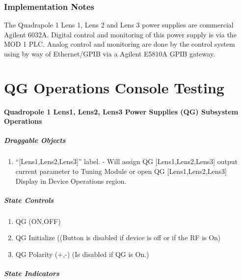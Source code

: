 \documentclass[11pt]{book}		%
\begin{document}
\subsection{Implementation Notes} \label{sect:cyc-equip-ctl-beamline-sm23a-implementation}

The Quadrapole 1 Lens 1, Lens 2 and Lens 3 power supplies are commercial Agilent 6032A.  Digital control and monitoring of this power supply is via the MOD 1 PLC.  Analog control and monitoring are done by the control system using by way of Ethernet/GPIB via a Agilent E5810A GPIB gateway.




\chapter{QG Operations Console Testing}

\subsubsection{Quadropole 1 Lens1, Lens2, Lens3 Power Supplies (QG) Subsystem Operations}\label{sect:cyc-op-interface-ops-terminal-subsys-ops-mainline-q1}

\paragraph{Draggable Objects}

\begin{enumerate}
 \item ``[Lens1,Lens2,Lens3]'' label. - Will assign QG [Lens1,Lens2,Lens3] output current parameter to Tuning Module or open QG [Lens1,Lens2,Lens3] Display in Device Operations region.
\end{enumerate}

\paragraph{State Controls}

\begin{enumerate}
 \item QG (ON,OFF)
 \item QG Initialize ((Button is disabled if device is off or if the RF is On)
 \item QG Polarity (+,-) (Is disabled if QG is On.)
\end{enumerate}

\paragraph{State Indicators}
\end{document}

